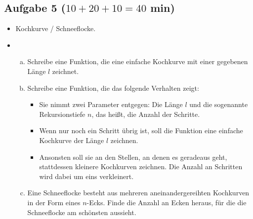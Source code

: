 	\subsection{Aufgabe 5 ($10 + 20 + 10 = 40$ min)}
	\begin{itemize}
		\item 
		Kochkurve / Schneeflocke.
		\item
		\begin{enumerate}[(a)]
			\item 
			Schreibe eine Funktion, die eine einfache Kochkurve mit einer gegebenen Länge $l$ zeichnet.
			\item
			Schreibe eine Funktion, die das folgende Verhalten zeigt:
			\begin{itemize}
				\item 
				Sie nimmt zwei Parameter entgegen: Die Länge $l$ und die sogenannte Rekursionstiefe $n$, das heißt, die Anzahl der Schritte.
				\item
				Wenn nur noch ein Schritt übrig ist, soll die Funktion eine einfache Kochkurve der Länge $l$ zeichnen.
				\item
				Ansonsten soll sie an den Stellen, an denen es geradeaus geht, stattdessen kleinere Kochkurven zeichnen. Die Anzahl an Schritten wird dabei um eins verkleinert.				
			\end{itemize}
			\item
			Eine Schneeflocke besteht aus mehreren aneinandergereihten Kochkurven in der Form eines $n$-Ecks. Finde die Anzahl an Ecken heraus, für die die Schneeflocke am schönsten aussieht.
		\end{enumerate}
	\end{itemize}
	
